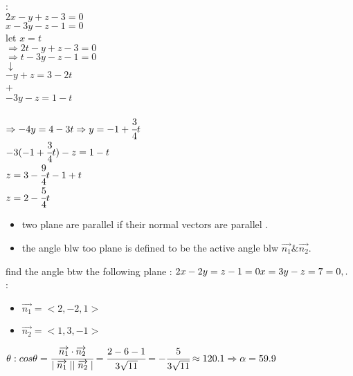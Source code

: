 \begin{example}
\noindent{\color{smalt(darkpowderblue)}\rule{\linewidth}{.2mm}}
{{}}: \\
$2x-y+z-3 =0$\\   
$x-3y-z-1=0$\\   let $x=t $\\ 
$\Rightarrow 2t-y+z-3 = 0$ \\
$\Rightarrow t-3y-z-1=0$\\
$\downarrow$\\
$-y+z=3-2t$\\
+\\
$-3y-z=1-t$\\ \\
$\Rightarrow -4y = 4-3t\\ \Rightarrow y=-1+\cfrac{3}{4} t$\\
$-3(-1+\cfrac{3}{4}t) -z = 1-t$\\
$z=3-\cfrac{9}{4}t - 1+t$\\
$z=2-\cfrac{5}{4} t$
\end{example} 
\begin{remark}
  \begin{itemize}
      \item  two plane are parallel if their normal vectors are parallel .
      \item  the angle blw too plane is defined to be the  active angle blw $\overrightarrow{n_{1}} \& \overrightarrow{n_{2}}.$
  \end{itemize}
\end{remark}
\begin{example}
find the angle btw the following plane : 
$ 2x-2y=z-1 = 0 \\
x=3y-z=7 = 0 ,.$
{{}}: 
\begin{itemize}
    \item $ \overrightarrow{n_{1}} = <2,-2,1>$
    \item $\overrightarrow{n_{2}} = <1,3,-1>$
\end{itemize}
$\theta : cos\theta = \cfrac{\overrightarrow{n_1} \cdot \overrightarrow{n_2}}{\mid \overrightarrow{n_1}\mid \mid \overrightarrow{n_2}\mid} = \cfrac{2-6-1}{3\sqrt{11}} = -\cfrac{5}{3\sqrt{11}} \approx 120.1\\
\Rightarrow \alpha = 59.9$\end{example}
\noindent{\color{smalt(darkpowderblue)}\rule{\linewidth}{.2mm}}

